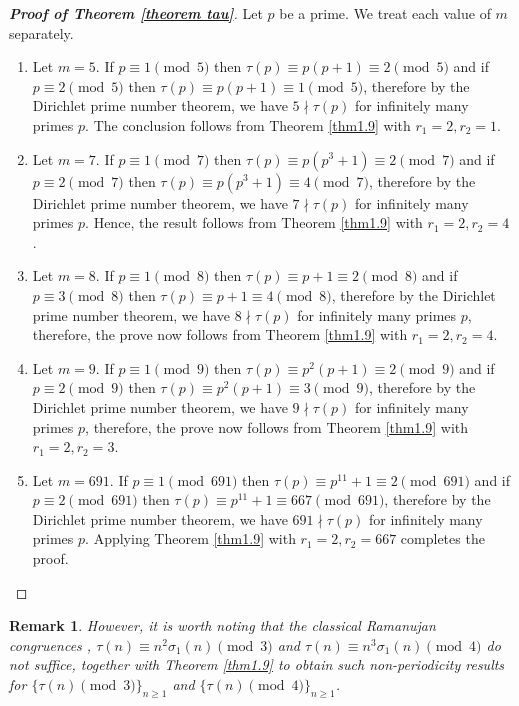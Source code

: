 \documentclass[12pt,reqno]{amsart}
\newtheorem{remark}[theorem]{Remark}
\begin{document}
\begin{proof}[\textbf{Proof of Theorem \ref{theorem tau}}]
Let $p$ be a prime. We treat each value of $m$ separately.
\noindent
\begin{enumerate}
    \item Let $m=5$. If $p\equiv 1 \pmod{5}$ then $\tau(p)\equiv p(p+1)\equiv 2 \pmod{5}$ and if $p\equiv 2 \pmod{5}$ then $\tau(p)\equiv p(p+1)\equiv 1 \pmod{5}$, therefore by the Dirichlet prime number theorem, we have $5\nmid \tau(p)$ for infinitely many primes $p$. The conclusion follows from Theorem \ref{thm1.9} with $r_1=2,r_2=1$.
     \item Let $m=7$. If $p\equiv 1 \pmod{7}$ then $\tau(p)\equiv p(p^3+1)\equiv 2 \pmod{7}$ and if $p\equiv 2 \pmod{7}$ then $\tau(p)\equiv p(p^3+1)\equiv 4 \pmod{7}$, therefore by the Dirichlet prime number theorem, we have $7\nmid \tau(p)$ for infinitely many primes $p$. Hence, the result follows from Theorem \ref{thm1.9} with $r_1=2,r_2=4$.
      \item Let $m=8$. If $p\equiv 1 \pmod{8}$ then $\tau(p)\equiv p+1\equiv 2 \pmod{8}$ and if $p\equiv 3 \pmod{8}$ then $\tau(p)\equiv p+1\equiv 4 \pmod{8}$, therefore by the Dirichlet prime number theorem, we have $8\nmid \tau(p)$ for infinitely many primes $p$, therefore, the prove now follows from Theorem \ref{thm1.9} with $r_1=2,r_2=4$.
      \item Let $m=9$. If $p\equiv 1 \pmod{9}$ then $\tau(p)\equiv p^2(p+1)\equiv 2 \pmod{9}$ and if $p\equiv 2 \pmod{9}$ then $\tau(p)\equiv p^2(p+1)\equiv 3 \pmod{9}$, therefore by the Dirichlet prime number theorem, we have $9\nmid \tau(p)$ for infinitely many primes $p$, therefore, the prove now follows from Theorem \ref{thm1.9} with $r_1=2,r_2=3$.
    \item Let $m=691$. If $p\equiv 1 \pmod{691}$ then $\tau(p)\equiv p^{11}+1\equiv 2 \pmod{691}$ and if $p\equiv 2 \pmod{691}$ then $\tau(p)\equiv p^{11}+1\equiv 667 \pmod{691}$, therefore by the Dirichlet prime number theorem, we have $691\nmid \tau(p)$ for infinitely many primes $p$. Applying Theorem \ref{thm1.9} with $r_1=2,r_2=667$ completes the proof.
\end{enumerate}
\end{proof}
\begin{remark}
However, it is worth noting that the classical Ramanujan congruences \cite{new1,new2}, $\tau(n)\equiv n^2\sigma_1(n) \pmod{3}$ and $\tau(n)\equiv n^3\sigma_1(n) \pmod{4}$ do not suffice, together with Theorem \ref{thm1.9} to obtain such non-periodicity results for $\{\tau(n) \pmod{3}\}_{n\geq1}$ and $\{\tau(n) \pmod{4}\}_{n\geq1}$.
\end{remark}
\end{document}
